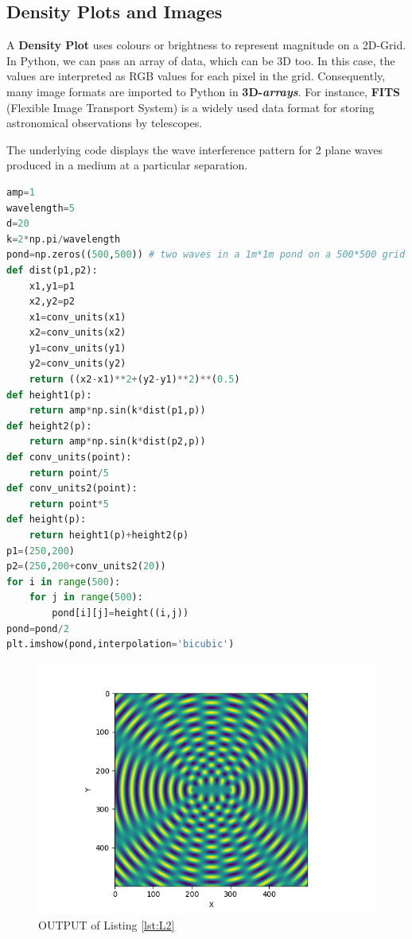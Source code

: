 \subsection{Density Plots and Images}
A \textbf{Density Plot} uses colours or brightness to represent magnitude on a 2D-Grid. In Python, we can pass an array of data, which can be 3D too. In this case, the values are interpreted as RGB values for each pixel in the grid. Consequently, many image formats are imported to Python in \textbf{3D-\textit{arrays}}. For instance, \textbf{FITS} (Flexible Image Transport System) is a widely used data format for storing astronomical observations by telescopes.\\
\par The underlying code displays the wave interference pattern for 2 plane waves produced in a medium at a particular separation.
\begin{lstlisting}[language=Python, caption=Interfernce Pattern, frame=single, label={lst:L2} ]
amp=1
wavelength=5
d=20
k=2*np.pi/wavelength
pond=np.zeros((500,500)) # two waves in a 1m*1m pond on a 500*500 grid
def dist(p1,p2):
	x1,y1=p1
	x2,y2=p2
	x1=conv_units(x1)
	x2=conv_units(x2)
	y1=conv_units(y1)
	y2=conv_units(y2)
	return ((x2-x1)**2+(y2-y1)**2)**(0.5)
def height1(p):
	return amp*np.sin(k*dist(p1,p))
def height2(p):
	return amp*np.sin(k*dist(p2,p))
def conv_units(point):
	return point/5
def conv_units2(point):
	return point*5
def height(p):
	return height1(p)+height2(p)
p1=(250,200)
p2=(250,200+conv_units2(20))
for i in range(500):
	for j in range(500):
		pond[i][j]=height((i,j))
pond=pond/2
plt.imshow(pond,interpolation='bicubic')
\end{lstlisting}
\begin{figure}[H]
	\centering
	\includegraphics[width=0.7\linewidth]{WaveInterference}
	\caption{OUTPUT of Listing \ref{lst:L2}}
	\label{fig:waveinterference}
\end{figure}